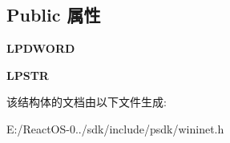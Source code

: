 \subsection*{Public 属性}
\begin{DoxyCompactItemize}
\item 
\mbox{\label{struct_auto_proxy_helper_vtbl_a3242d603dbd5817da819a7605c1f22c2}} 
{\bfseries L\+P\+D\+W\+O\+RD}
\item 
\mbox{\label{struct_auto_proxy_helper_vtbl_a80a88d5bbdc6fbc7c462cfbb75e38333}} 
{\bfseries L\+P\+S\+TR}
\end{DoxyCompactItemize}


该结构体的文档由以下文件生成\+:\begin{DoxyCompactItemize}
\item 
E\+:/\+React\+O\+S-\/0../sdk/include/psdk/wininet.\+h\end{DoxyCompactItemize}
